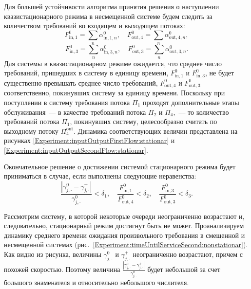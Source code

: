 Для большей устойчивости алгоритма принятия решения о наступлении квазистационарного режима в несмещенной системе будем следить за количеством требований во входящем и выходящем потоках:
\begin{equation}
    F^{0}_{\text{in},1} = \sum_n \alpha^{0}_{\text{in},1,n}, \quad 
    F^{0}_{\text{out},4} = \sum_n \alpha^{0}_{\text{out},4,n},
\end{equation}
\begin{equation}
    F^{0}_{\text{in},3} = \sum_n \alpha^{0}_{\text{in},3,n}, \quad 
    F^{0}_{\text{out},3} = \sum_n \alpha^{0}_{\text{out},3,n}.
\end{equation}
Для системы в квазистационарном режиме ожидается, что среднее число требований, пришедших в систему в единицу времени, $F^{0}_{\text{in},1}$ и $F^{0}_{\text{in},3}$, не будет существенно превышать среднее число требований, $ F^{0}_{\text{out},4}$ и $F^{0}_{\text{out},3}$ соответственно, покинувших систему за единицу времени. Поскольку при поступлении в систему требования потока $\Pi_1$ проходят дополнительные этапы обслуживания~--- в качестве требований потока $\Pi_2$ и $\Pi_4$,~--- то количество требований потока $\Pi_1$, покинувших систему, целесообразно считать по выходному потоку $\Pi_4^{\text{out}}$. Динамика соответствующих величин представлена на рисунках \ref{Experiment:inputOutputFirstFlow:stationar} и \ref{Experiment:inputOutputSecondFlow:stationar}.





Окончательное решение о достижении системой стационарного режима будет приниматься в случае, если выполнены следующие неравенства:
\begin{equation}
    \frac{|\gamma_{j,\cdot}^0 - \gamma_{j,\cdot}^+|}{\gamma_{j,\cdot}^0} < \delta_1, \quad
    \frac{F^{0}_{\text{in},1}}{F^{0}_{\text{out},4}} < \delta_2, \quad 
    \frac{F^{0}_{\text{in},3}}{F^{0}_{\text{out},3}} < \delta_3.
\end{equation}

Рассмотрим систему, в которой некоторые очереди неограниченно возрастают и, следовательно, стационарный режим достигнут быть не может. Проанализируем динамику среднего времени ожидания произвольного требования в смещенной и несмещенной системах (рис.~\ref{Experiment:timeUntilServiceSecond:nonstationar}).  Как видно из рисунка, величины $\gamma_{j,\cdot}^0$ и $ \gamma_{j,\cdot}^+$ неограниченно возрастают, причем с похожей скоростью. Поэтому величина $\frac{|\gamma_{j,\cdot}^0 - \gamma_{j,\cdot}^+|}{\gamma_{j,\cdot}^0} $ будет небольшой за счет большого знаменателя и относительно небольшого числителя. 


